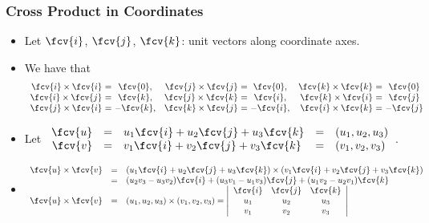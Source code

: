 \begin{frame}
 \frametitle{Cross Product in Coordinates}

\begin{itemize}
\item Let $\fcv{i}$, $\fcv{j}$, $\fcv{k}$: unit vectors along coordinate axes.
\item We have that
\[
\begin{array}{r@{}c@{}cr@{}c@{}cr@{}c@{}c}
\fcv{i} \times \fcv{i} &~=~& \fcv{0}, & \fcv{j} \times \fcv{j} &~=~&\fcv{0} , & \fcv{k} \times \fcv{k} &~=~& \fcv{0} \\
\fcv{i} \times \fcv{j} &~=~& \fcv{k}, & \fcv{j} \times \fcv{k} &~=~& \fcv{i}, &  \fcv{k} \times \fcv{i}& ~=~& \fcv{j}\\
\fcv{j} \times \fcv{i} &~=~& -\fcv{k}, & \fcv{k} \times \fcv{j} &~=~& -\fcv{i},& \fcv{i} \times \fcv{k} &~=~& -\fcv{j}
\end{array}
\]
\item Let $\begin{array}{rclcl}
\fcv{u} &=& u_1 \fcv{i} + u_2 \fcv{j} + u_3 \fcv{k} &=& ( u_1, u_2, u_3 ) \\
\fcv{v}&=&v_1 \fcv{i} + v_2 \fcv{j} + v_3 \fcv{k} &=& ( v_1, v_2, v_3 )\end{array}$.
\item
\[\begin{array}{rcl}
\fcv{u} \times \fcv{v} &=& (u_1 \fcv{i} + u_2 \fcv{j} + u_3 \fcv{k})
\times (v_1 \fcv{i} + v_2 \fcv{j} + v_3 \fcv{k})\\
&=& (u_2v_3 -u_3v_2) \fcv{i} + (u_3v_1-u_1v_3) \fcv{j} + (u_1v_2-u_2v_1) \fcv{k} \\
\fcv{u} \times \fcv{v} &=&
( u_1, u_2, u_3 ) \times ( v_1, v_2, v_3 ) =
\left|
\begin{array}{ccc}
\fcv{i} & \fcv{j} & \fcv{k} \\
u_1 & u_2 & u_3 \\
v_1 & v_2 & v_3
\end{array}
\right|
\end{array}
\]



\end{itemize}
\end{frame}
